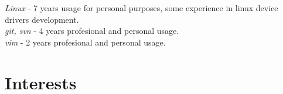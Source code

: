 \documentclass[12]{article}
\begin{document}
{
	\textit{Linux} - 7 years usage for personal purposes, some experience in linux device drivers development.\\
	\textit{git, svn} - 4 years profesional and personal usage.\\
	\textit{vim} - 2 years profesional and personal usage.\\
}


\section{Interests}

\end{document}
